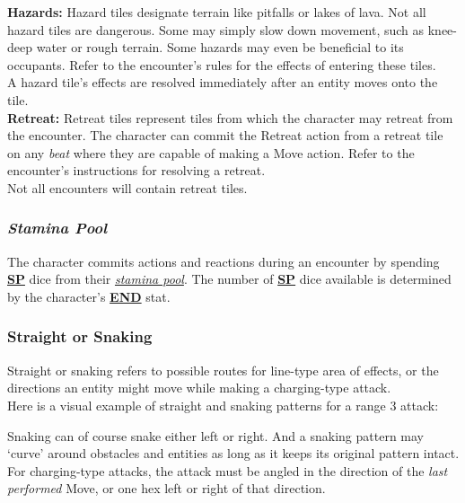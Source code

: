 \documentclass[12pt]{article}
\newcommand{\refto}[1]{\hyperlink{#1}{\textbf{#1}}}
\newcommand{\reftoit}[1]{\hyperlink{#1}{\emph{#1}}}
\begin{document}
\begin{multicols*}{2}
\textbf{Hazards:} Hazard tiles designate terrain like pitfalls or lakes of lava. Not all hazard tiles are dangerous. Some may simply slow down movement, such as knee-deep water or rough terrain. Some hazards may even be beneficial to its occupants. Refer to the encounter’s rules for the effects of entering these tiles.\\
A hazard tile’s effects are resolved immediately after an entity moves onto the tile.\\

\textbf{Retreat:} Retreat tiles represent tiles from which the character may retreat from the encounter. The character can commit the Retreat action from a retreat tile on any \emph{beat} where they are capable of making a Move action. Refer to the encounter’s instructions for resolving a retreat.\\
Not all encounters will contain retreat tiles.

\subsubsection{\emph{Stamina Pool}}
\hypertarget{stamina pool}{}
The character commits actions and reactions during an encounter by spending \refto{SP} dice from their \reftoit{stamina pool}. The number of \refto{SP} dice available is determined by the character’s \refto{END} stat.

\subsubsection{Straight or Snaking}
Straight or snaking refers to possible routes for line-type area of effects, or the directions an entity might move while making a charging-type attack.\\
Here is a visual example of straight and snaking patterns for a range 3 attack:
\begin{center}
\end{center}
Snaking can of course snake either left or right. And a snaking pattern may ‘curve’ around obstacles and entities as long as it keeps its original pattern intact.\\
For charging-type attacks, the attack must be angled in the direction of the \emph{last performed} Move, or one hex left or right of that direction.


\end{multicols*}
\end{document}
